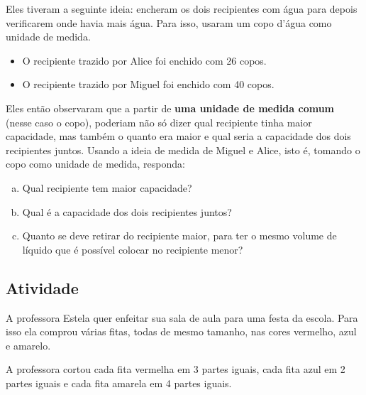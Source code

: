\documentclass[a4,12pt]{book}
\begin{document}
Eles tiveram a seguinte ideia: encheram os dois recipientes com água para depois verificarem onde havia mais água. Para isso, usaram um copo d'água como unidade de medida. 
\begin{itemize}
 \item O recipiente trazido por Alice foi enchido com 26 copos.
 \item O recipiente trazido por Miguel foi enchido com 40 copos.
\end{itemize}
Eles então observaram que a partir de {\bf uma unidade de medida comum} (nesse caso o copo), poderiam não só dizer qual recipiente tinha maior capacidade, mas também o quanto era maior e qual seria a capacidade dos dois recipientes juntos. 
Usando a ideia de medida de Miguel e Alice, isto é, tomando o copo como unidade de medida, responda:
  \begin{enumerate}[a)]
   \item Qual recipiente tem maior capacidade?
   \item Qual é a capacidade dos dois recipientes juntos?
   \item Quanto se deve retirar do recipiente maior, para ter o mesmo volume de líquido que é possível colocar no recipiente menor?
  \end{enumerate}


\subsection{Atividade}

A professora Estela quer enfeitar sua sala de aula para uma festa da escola. Para isso ela comprou várias fitas, todas de mesmo tamanho, nas cores vermelho, azul e amarelo.
  
\begin{center}
\end{center}


A professora cortou cada fita vermelha em 3 partes iguais, cada fita azul em 2 partes iguais e cada fita amarela em 4 partes iguais.

\begin{center}
\end{center}
\end{document}
